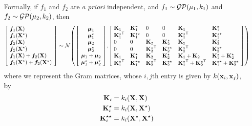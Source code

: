 Formally, if $f_1$ and $f_2$ are \emph{a priori} independent, and $f_1 \sim \mathcal{GP}( \mu_1, k_1)$ and ${f_2 \sim \mathcal{GP}( \mu_2, k_2)}$, then
%
\begin{align}
\left[ \! \begin{array}{l} 
\vf_1(\vX) \\
\vf_1(\vX^\star) \\
\vf_2(\vX) \\
\vf_2(\vX^\star) \\
\vf_1(\vX) + \vf_2(\vX) \\
\vf_1(\vX^\star) + \vf_2(\vX^\star)
\end{array} \! \right]
\sim
\Nt{
\left[ \! \begin{array}{c} \vmu_1 \\ \vmu_1^\star \\ \vmu_2 \\ \vmu_2^\star \\ \vmu_1 + \vmu_2 \\ \vmu_1^\star + \vmu_2^\star \end{array} \! \right] \!
}
{\! \left[ \! \begin{array}{llllll}%
\vK_1 & \vK_1^\star & 0 & 0 & \vK_1 & \vK_1^\star \\ 
{\vK_1^\star}\tra & \vK_1^{\star\star} & 0 & 0 & {\vK_1^\star}\tra & \vK_1^{\star\star} \\
0 & 0 & \vK_2 & {\vK_2^\star} & \vK_2 & \vK_2^\star \\ 
0 & 0 & {\vK_2^\star}\tra & \vK_2^{\star\star} & {\vK_2^\star}\tra & \vK_2^{\star\star} \\
{\vK_1} & \vK_1^\star & \vK_2 & \vK_2^\star & \vK_1 + \vK_2 & \vK_1^\star + \vK_2^\star \\ 
{\vK_1^\star}\tra & \vK_1^{\star\star}  & {\vK_2^\star}\tra & \vK_2^{\star\star}  & {\vK_1^\star}\tra + {\vK_2^\star}\tra & \vK_1^{\star\star} + \vK_2^{\star\star}\\
\end{array} \! \right]
}
\end{align}
%
where we represent the Gram matrices, whose $i,j$th entry is given by $k({\bf{x}}_i, {\bf{x}}_j)$, by
%
\begin{align}
\mathbf{K}_i & = k_i( \mathbf{X}, \mathbf{X} ) \\
\mathbf{K}_i^\star & = k_i( \mathbf{X}, \mathbf{X}^\star ) \\
\mathbf{K}_i^{\star\star} & = k_i( \mathbf{X}^\star, \mathbf{X}^\star )
\end{align}

